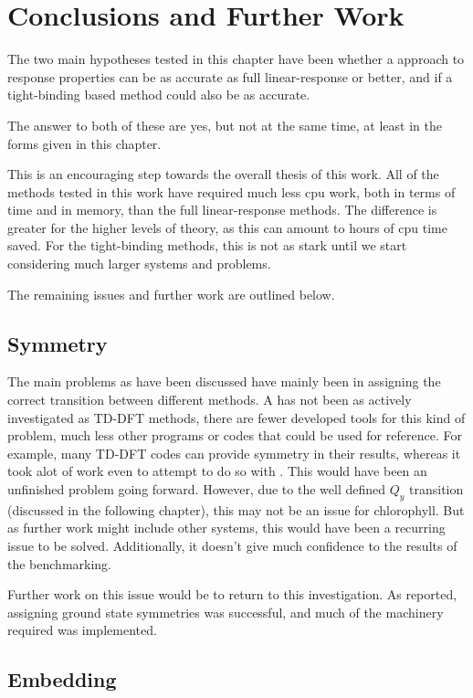 \section{Conclusions and Further Work}
The two main hypotheses tested in this chapter have been whether a \dscf approach
to response properties can be as accurate as full linear-response or better, and
if a tight-binding based method could also be as accurate.

The answer to both of these are yes, but not at the same time, at least in the 
forms given in this chapter.

This is an encouraging step towards the overall thesis of this work. All of the
\dscf methods tested in this work have required much less cpu work, both in terms
of time and in memory, than the full linear-response methods. The difference is 
greater for the higher levels of theory, as this can amount to hours of cpu time
saved. For the tight-binding methods, this is not as stark until we start considering
much larger systems and problems.

The remaining issues and further work are outlined below.

\subsection{Symmetry}
\label{sec:dscf_symmetry}

The main problems as have been discussed have mainly been in assigning the correct
transition between different methods. A \dscf has not been as actively investigated
as TD-DFT methods, there are fewer developed tools for this kind of problem, much
less other programs or codes that could be used for reference. For example, many
TD-DFT codes can provide symmetry in their results, whereas it took alot of work
even to attempt to do so with \dscf. This would have been an unfinished problem 
going forward. However, due to the well defined $Q_y$ transition (discussed in the
following chapter), this may not be an issue for chlorophyll. But as further
work might include other systems, this would have been a recurring issue to be
solved. Additionally, it doesn't give much confidence to the results of the benchmarking.

Further work on this issue would be to return to this investigation. As reported, 
assigning ground state symmetries was successful, and much of the machinery required
was implemented.

\subsection{Embedding}
\label{subsec:dscf_embedding}

